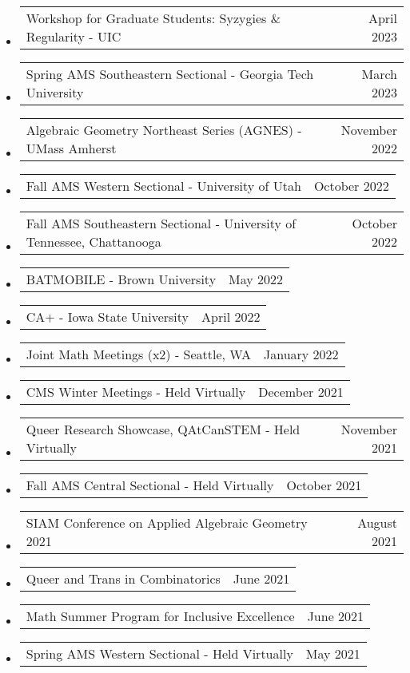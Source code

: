 \documentclass[letterpaper,11pt]{article}
\makeatletter
\newcommand{\ressubheadingTalk}[2]{
\begin{tabular*}{6.5in}[t]{l@{\cftdotfill{\cftsecdotsep}\extracolsep{\fill}}r}
		#1 & #2 \\
\end{tabular*}\vspace{-6pt}}
\makeatother
\begin{document}
\begin{itemize}
\item
	\ressubheadingTalk{Workshop for Graduate Students: Syzygies \& Regularity - UIC}{April 2023}

\item
	\ressubheadingTalk{Spring AMS Southeastern Sectional - Georgia Tech University}{March 2023}
	
\item
	\ressubheadingTalk{Algebraic Geometry Northeast Series (AGNES) - UMass Amherst}{November 2022}
	
\item
	\ressubheadingTalk{Fall AMS Western Sectional - University of Utah}{October 2022}
	
\item
	\ressubheadingTalk{Fall AMS Southeastern Sectional - University of Tennessee, Chattanooga}{October 2022}
	
\item
	\ressubheadingTalk{BATMOBILE - Brown University}{May 2022}
	
\item
	\ressubheadingTalk{CA+ - Iowa State University}{April 2022}

\item
	\ressubheadingTalk{Joint Math Meetings (x2) - Seattle, WA}{January 2022}\footnotemark[2]

\item
	\ressubheadingTalk{CMS Winter Meetings - Held Virtually}{December 2021}
		
\item
	\ressubheadingTalk{Queer Research Showcase, QAtCanSTEM  - Held Virtually}{November 2021}
	
\item
	\ressubheadingTalk{Fall AMS Central Sectional - Held Virtually}{October 2021}
	
\item
	\ressubheadingTalk{SIAM Conference on Applied Algebraic Geometry 2021}{August 2021}

\item
	\ressubheadingTalk{Queer and Trans in Combinatorics}{June 2021}
		
\item
	\ressubheadingTalk{Math Summer Program for Inclusive Excellence}{June 2021}
	
\item
	\ressubheadingTalk{Spring AMS Western Sectional - Held Virtually}{May 2021}


\end{itemize}
\end{document}
